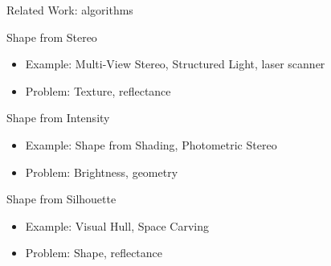 \documentclass[10pt]{beamer}
\begin{document}
\begin{frame}{Related Work: algorithms}

\begin{exampleblock}{Shape from Stereo}
  \begin{itemize}
    \item Example: Multi-View Stereo, Structured Light, laser scanner
    \item Problem: Texture, reflectance
  \end{itemize}
\end{exampleblock}

\begin{exampleblock}{Shape from Intensity}
  \begin{itemize}
    \item Example: Shape from Shading, Photometric Stereo
    \item Problem: Brightness, geometry
  \end{itemize}
\end{exampleblock}

\begin{exampleblock}{Shape from Silhouette}
  \begin{itemize}
    \item Example: Visual Hull, Space Carving
    \item Problem: Shape, reflectance
  \end{itemize}
\end{exampleblock}



\end{frame}
\end{document}
